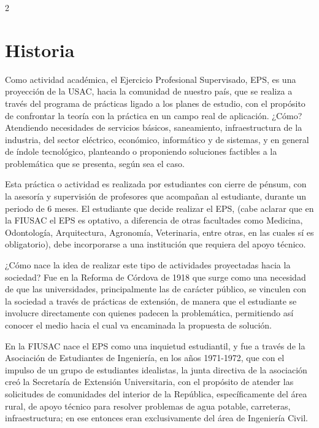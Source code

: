\documentclass[11pt,spanish,Letterpaper,openany]{book}
\begin{document}
\begin {multicols*}{2}

\hypertarget{historia}{%
\section*{Historia}\label{historia}}

Como actividad académica, el Ejercicio Profesional Supervisado, EPS, es una proyección de la USAC, hacia la comunidad de nuestro país, que se realiza a través del programa de prácticas ligado a los planes de estudio, con el propósito de confrontar la teoría con la práctica en un campo real de aplicación. ¿Cómo? Atendiendo necesidades de servicios básicos, saneamiento, infraestructura de la industria, del sector eléctrico, económico, informático y de sistemas, y en general de índole tecnológico, planteando o proponiendo soluciones factibles a la problemática que se presenta, según sea el caso.

Esta práctica o actividad es realizada por estudiantes con cierre de pénsum, con la asesoría y supervisión de profesores que acompañan al estudiante, durante un periodo de 6 meses. El estudiante que decide realizar el EPS, (cabe aclarar que en la FIUSAC el EPS es optativo, a diferencia de otras facultades como Medicina, Odontología, Arquitectura, Agronomía, Veterinaria, entre otras, en las cuales sí es obligatorio), debe incorporarse a una institución que requiera del apoyo técnico.

¿Cómo nace la idea de realizar este tipo de actividades proyectadas hacia la sociedad? Fue en la Reforma de Córdova de 1918 que surge como una necesidad de que las universidades, principalmente las de carácter público, se vinculen con la sociedad a través de prácticas de extensión, de manera que el estudiante se involucre directamente con quienes padecen la problemática, permitiendo así conocer el medio hacia el cual va encaminada la propuesta de solución.

En la FIUSAC nace el EPS como una inquietud estudiantil, y fue a través de la Asociación de Estudiantes de Ingeniería, en los años 1971-1972, que con el impulso de un grupo de estudiantes idealistas, la junta directiva de la asociación creó la Secretaría de Extensión Universitaria, con el propósito de atender las solicitudes de comunidades del interior de la República, específicamente del área rural, de apoyo técnico para resolver problemas de agua potable, carreteras, infraestructura; en ese entonces eran exclusivamente del área de Ingeniería Civil.


\end{multicols*}
\end{document}
